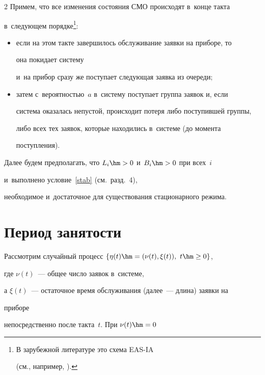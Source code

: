 \begin{multicols}{2}
Примем, что все изменения состояния СМО происходят в~конце такта 


в~следующем порядке\footnote{В зарубежной литературе это схема EAS-IA 


(см., например, \cite[с.~2--3]{nobel}).}:


\begin{itemize}


\item если на этом такте завершилось обслуживание заявки на приборе, то 


она покидает систему


и~на прибор сразу же поступает следующая заявка из очереди;


\item затем с~вероятностью~$a$ в~систему поступает группа заявок и, если 


система оказалась непустой, происходит потеря либо поступившей группы, 


либо всех тех заявок, которые находились в~системе (до момента 


поступления).


\end{itemize}





Далее будем предполагать, что $L_i\hm>0$ и~$B_i\hm>0$ при всех~$i$ 


и~выполнено условие~\eqref{stab} (см.\ разд.~4),


необходимое и~достаточное для существования стационарного режима.


\vspace*{-.5pt}





\section{Период занятости}





Рассмотрим случайный процесс $\{ \eta(t)\hm=(\nu(t),\xi(t)), \ t \hm\ge 


0\}$,


где $\nu(t)$~--- общее число заявок в~системе,


а $\xi(t)$~--- остаточное время обслуживания (далее~--- длина) заявки на 


приборе


непосредственно после такта~$t$. При $\nu(t)\hm=0$



\end{multicols}
